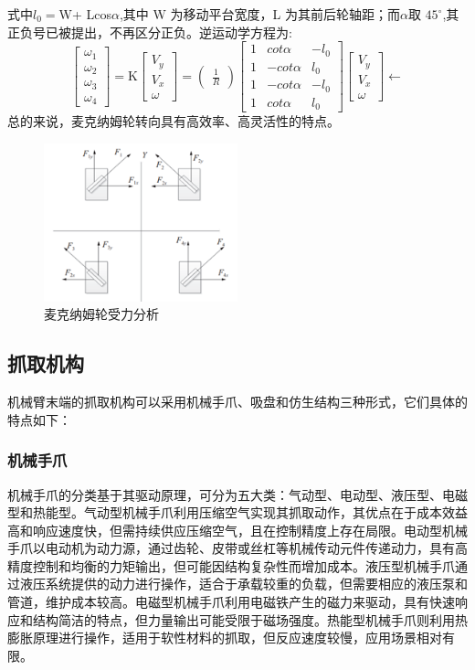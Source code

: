 \documentclass{report}
\begin{document}
式中$l_0=$W+ Lcos$\alpha$,其中 W 为移动平台宽度，L 为其前后轮轴距；而$\alpha$取
$45^{\circ}$,其正负号已被提出，不再区分正负。逆运动学方程为:
\[\begin{bmatrix}\omega_1\\\omega_2\\\omega_3\\\omega_4\end{bmatrix}=\text{K}\begin{bmatrix}V_y\\V_x\\\omega\end{bmatrix}=\begin{pmatrix}\frac{1}{R}\end{pmatrix}\begin{bmatrix}1&cot\alpha&-l_0\\1&-cot\alpha&l_0\\1&-cot\alpha&-l_0\\1&cot\alpha&l_0\end{bmatrix}\begin{bmatrix}V_y\\V_x\\\omega\end{bmatrix}\leftarrow \]
总的来说，麦克纳姆轮转向具有高效率、高灵活性的特点。
\begin{figure}[ht]
  \centering
  \includegraphics[width=0.5\textwidth]{figures/mac.png}
  \caption{麦克纳姆轮受力分析 }
\end{figure}
\subsection{抓取机构}
\label{subsec:label}
机械臂末端的抓取机构可以采用机械手爪、吸盘和仿生结构三种形式，它们具体的特点如下：
\subsubsection{机械手爪}
\label{subsec:label}
机械手爪的分类基于其驱动原理，可分为五大类：气动型、电动型、液压型、电磁型和热能型。气动型机械手爪利用压缩空气实现其抓取动作，其优点在于成本效益高和响应速度快，但需持续供应压缩空气，且在控制精度上存在局限。电动型机械手爪以电动机为动力源，通过齿轮、皮带或丝杠等机械传动元件传递动力，具有高精度控制和均衡的力矩输出，但可能因结构复杂性而增加成本。液压型机械手爪通过液压系统提供的动力进行操作，适合于承载较重的负载，但需要相应的液压泵和管道，维护成本较高。电磁型机械手爪利用电磁铁产生的磁力来驱动，具有快速响应和结构简洁的特点，但力量输出可能受限于磁场强度。热能型机械手爪则利用热膨胀原理进行操作，适用于软性材料的抓取，但反应速度较慢，应用场景相对有限。
\end{document}
